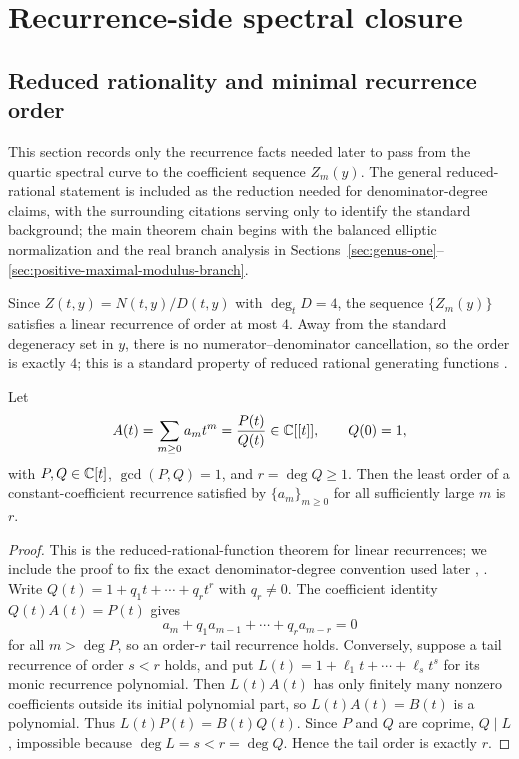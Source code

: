 \section{Recurrence-side spectral closure}\label{sec:hankel}\label{sec:minimal-spectral-closure}

\subsection{Reduced rationality and minimal recurrence order}

This section records only the recurrence facts needed later to pass from the
quartic spectral curve to the coefficient sequence \(Z_m(y)\).
The general reduced-rational statement is included as the reduction needed for denominator-degree claims, with the surrounding citations serving only to identify the standard background;
the main theorem chain begins with the balanced elliptic normalization
and the real branch analysis in Sections~\ref{sec:genus-one}--\ref{sec:positive-maximal-modulus-branch}.

Since $Z(t,y)=N(t,y)/D(t,y)$ with $\deg_t D=4$, the sequence $\{Z_m(y)\}$ satisfies a linear recurrence of order at most $4$.
Away from the standard degeneracy set in $y$, there is no numerator--denominator cancellation, so the order is exactly $4$; this is a standard property of reduced rational generating functions \cite{Stanley2012,FlajoletSedgewick2009,Partington1989}.

\begin{lemma}\label{lem:reduced-rational-hankel}
Let
\[
A(t)=\sum_{m\ge0}a_m t^m=\frac{P(t)}{Q(t)}\in\mathbb{C}[[t]],
\qquad
Q(0)=1,
\]
with \(P,Q\in\mathbb{C}[t]\), \(\gcd(P,Q)=1\), and \(r=\deg Q\ge1\).
Then the least order of a constant-coefficient recurrence satisfied by \(\{a_m\}_{m\ge0}\) for all sufficiently large \(m\) is \(r\).
\end{lemma}

\begin{proof}
This is the reduced-rational-function theorem for linear recurrences; we include the proof to fix the exact denominator-degree convention used later \cite[Sec.~4.1]{FlajoletSedgewick2009}, \cite[Chap.~4]{Stanley2012}.
Write \(Q(t)=1+q_1t+\cdots+q_rt^r\) with \(q_r\ne0\).
The coefficient identity \(Q(t)A(t)=P(t)\) gives
\[
a_m+q_1a_{m-1}+\cdots+q_ra_{m-r}=0
\]
for all \(m>\deg P\), so an order-\(r\) tail recurrence holds.
Conversely, suppose a tail recurrence of order \(s<r\) holds, and put \(L(t)=1+\ell_1t+\cdots+\ell_st^s\) for its monic recurrence polynomial.
Then \(L(t)A(t)\) has only finitely many nonzero coefficients outside its initial polynomial part, so \(L(t)A(t)=B(t)\) is a polynomial.
Thus \(L(t)P(t)=B(t)Q(t)\).
Since \(P\) and \(Q\) are coprime, \(Q\mid L\), impossible because \(\deg L=s<r=\deg Q\).
Hence the tail order is exactly \(r\).
\end{proof}

